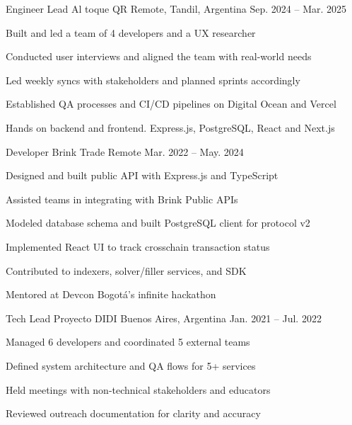 
\begin{cventries}

\cventry
{Engineer Lead} %
{Al toque QR} %
{Remote, Tandil, Argentina} %
{Sep. 2024 – Mar. 2025}
{
\begin{cvitems}
\item {Built and led a team of 4 developers and a UX researcher}
\item {Conducted user interviews and aligned the team with real-world needs}
\item {Led weekly syncs with stakeholders and planned sprints accordingly}
\item {Established QA processes and CI/CD pipelines on Digital Ocean and Vercel}
\item {Hands on backend and frontend. Express.js, PostgreSQL, React and Next.js}
\end{cvitems}
}

\cventry
{Developer} %
{Brink Trade} %
{Remote} %
{Mar. 2022 – May. 2024}
{
\begin{cvitems}
\item {Designed and built public API with Express.js and TypeScript}
\item {Assisted teams in integrating with Brink Public APIs}
\item {Modeled database schema and built PostgreSQL client for protocol v2}
\item {Implemented React UI to track crosschain transaction status}
\item {Contributed to indexers, solver/filler services, and SDK}
\item {Mentored at Devcon Bogotá's infinite hackathon}
\end{cvitems}
}

\cventry
{Tech Lead} %
{Proyecto DIDI} %
{Buenos Aires, Argentina} %
{Jan. 2021 – Jul. 2022}
{
\begin{cvitems}
\item {Managed 6 developers and coordinated 5 external teams}
\item {Defined system architecture and QA flows for 5+ services}
\item {Held meetings with non-technical stakeholders and educators}
\item {Reviewed outreach documentation for clarity and accuracy}
\end{cvitems}
}


\end{cventries}

